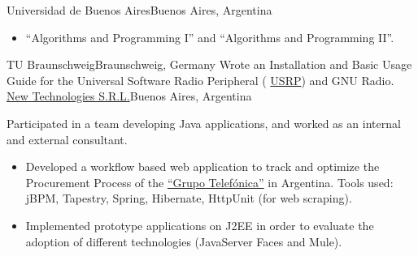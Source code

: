 \documentclass[11pt,a4paper]{moderncv}
\newcommand\weblink[2] {{\color{href} \href{#1}{#2}}}
\begin{document}
%
{Universidad de Buenos Aires}{Buenos Aires, Argentina}{}{%
\begin{itemize}%
  \item ``Algorithms and Programming I'' and ``Algorithms and Programming II''.
\end{itemize}
}
%
{TU Braunschweig}{Braunschweig, Germany}{}{%
Wrote an Installation and Basic Usage Guide for the Universal Software Radio
Peripheral (\weblink{http://www.ettus.com/products}{USRP\texttrademark}) and
GNU Radio.
}
%
{\weblink{http://www.newtechnologies.com.ar}{New Technologies S.R.L.}}{Buenos
Aires, Argentina}{}{%
Participated in a team developing Java applications, and
worked as an internal and external consultant.
\begin{itemize}
  \item Developed a workflow based web application to track and optimize the
    Procurement Process of the \weblink{http://www.telefonica.com/}{``Grupo
    Telefónica''} in Argentina.  Tools used: jBPM, Tapestry, Spring, Hibernate,
    HttpUnit (for web scraping).
  \item Implemented prototype applications on J2EE in order to evaluate the
    adoption of different technologies (JavaServer Faces and Mule).
\end{itemize}
}


\end{document}
